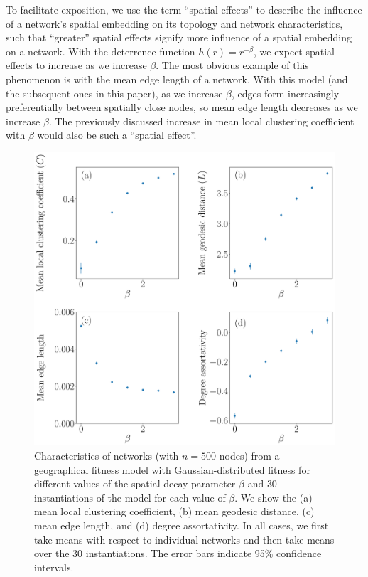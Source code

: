 \documentclass[%
 reprint,
 amsmath,amssymb,
 aps,
]{revtex4-1}
\begin{document}

To facilitate exposition, we use the term ``spatial effects'' to describe the influence of a {\color{red}network's} spatial embedding on 
{\color{red}its} topology and network characteristics, such that ``greater'' spatial effects signify more influence of a spatial embedding on a network. With the deterrence function $h(r) = r^{-\beta}$, we expect spatial effects to increase as we increase $\beta$. The most obvious example of this phenomenon is with the mean edge length of a network. With this model (and the subsequent ones in this paper), as we increase $\beta$, edges form increasingly preferentially between spatially close nodes, so mean edge length decreases as we increase $\beta$.  {\color{red}The previously discussed increase in mean local clustering coefficient with $\beta$ would also be such a ``spatial effect''.}


\begin{figure}
    \centering
    \includegraphics[width=1.0\linewidth]{geographical_network_metrics4.pdf}
    \caption{Characteristics of networks (with $n = 500$ nodes) from a geographical fitness model with Gaussian-distributed fitness for different values of the spatial decay parameter $\beta$ and $30$ instantiations of the model for each value of $\beta$. We show the (a) mean local clustering coefficient, (b) mean geodesic distance, (c) mean edge length, and (d) degree assortativity. In all cases, we first take means with respect to individual networks and then take means over the $30$ instantiations. The error bars indicate 95\% confidence intervals.
    }
    \label{fig:gf_metrics}
\end{figure}
\end{document}
